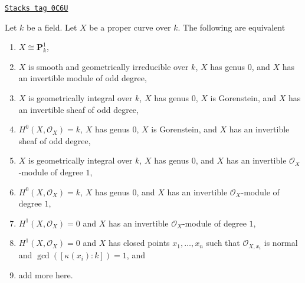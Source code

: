 \begin{proposition}

\label{curves-proposition-projective-line}
\href{https://stacks.math.columbia.edu/tag/0C6U}{\texttt{Stacks tag 0C6U}}

Let $k$ be a field. Let $X$ be a proper curve over $k$.
The following are equivalent
\begin{enumerate}
\item $X \cong \mathbf{P}^1_k$,
\item $X$ is smooth and geometrically irreducible over $k$,
$X$ has genus $0$, and $X$ has an invertible module of odd degree,
\item $X$ is geometrically integral over $k$, $X$ has genus $0$,
$X$ is Gorenstein, and $X$ has an invertible sheaf of odd degree,
\item $H^0(X, \mathcal{O}_X) = k$, $X$ has genus $0$, $X$ is Gorenstein,
and $X$ has an invertible sheaf of odd degree,
\item $X$ is geometrically integral over $k$, $X$ has genus $0$,
and $X$ has an invertible $\mathcal{O}_X$-module of degree $1$,
\item $H^0(X, \mathcal{O}_X) = k$, $X$ has genus $0$,
and $X$ has an invertible $\mathcal{O}_X$-module of degree $1$,
\item $H^1(X, \mathcal{O}_X) = 0$ and $X$ has an invertible
$\mathcal{O}_X$-module of degree $1$,
\item $H^1(X, \mathcal{O}_X) = 0$ and $X$
has closed points $x_1, \ldots, x_n$ such that
$\mathcal{O}_{X, x_i}$ is normal and $\gcd([\kappa(x_i) : k]) = 1$, and
\item add more here.
\end{enumerate}
\end{proposition}

